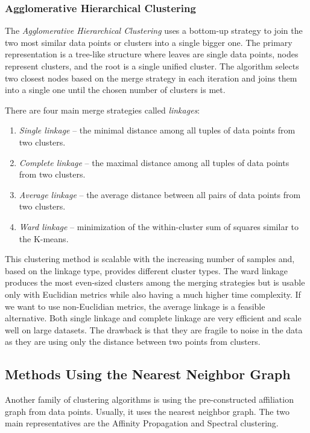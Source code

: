 \subsubsection{Agglomerative Hierarchical Clustering}
The \textit{Agglomerative Hierarchical Clustering} \cite{vis:agg-cluster, vis:kmeans} uses a bottom-up strategy to join the two most similar data points or clusters into a single bigger one. The primary representation is a tree-like structure where leaves are single data points, nodes represent clusters, and the root is a single unified cluster. The algorithm selects two closest nodes based on the merge strategy in each iteration and joins them into a single one until the chosen number of clusters is met.

There are four main merge strategies called \textit{linkages}:
\begin{enumerate}
    \item \textit{Single linkage} -- the minimal distance among all tuples of data points from two clusters.
    \item \textit{Complete linkage} -- the maximal distance among all tuples of data points from two clusters.
    \item \textit{Average linkage} -- the average distance between all pairs of data points from two clusters.
    \item \textit{Ward linkage} -- minimization of the within-cluster sum of squares similar to the K-means.
\end{enumerate}
This clustering method is scalable with the increasing number of samples and, based on the linkage type, provides different cluster types. The ward linkage produces the most even-sized clusters among the merging strategies but is usable only with Euclidian metrics while also having a much higher time complexity. If we want to use non-Euclidian metrics, the average linkage is a feasible alternative. Both single linkage and complete linkage are very efficient and scale well on large datasets. The drawback is that they are fragile to noise in the data as they are using only the distance between two points from clusters.

\subsection{Methods Using the Nearest Neighbor Graph}
Another family of clustering algorithms is using the pre-constructed affiliation graph from data points. Usually, it uses the nearest neighbor graph. The two main representatives are the Affinity Propagation and Spectral clustering. 
